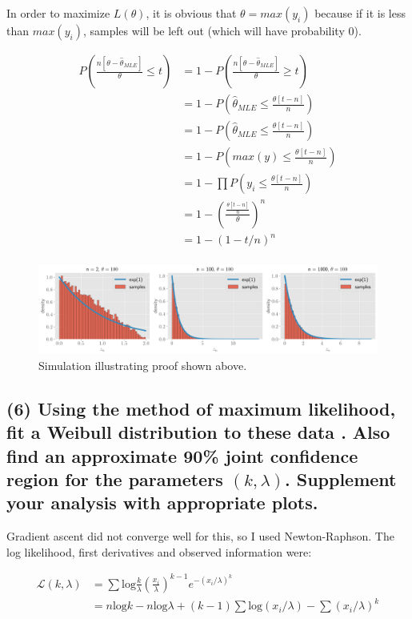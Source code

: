 \documentclass[11pt]{article}
\begin{document}
In order to maximize $L(\theta)$, it is obvious that $\theta = max(y_i)$ because if it is less than $ max(y_i)$, samples will be left out (which  will have probability 0).

\begin{align*}
    P\left(\frac{n[\theta-\hat{\theta}_{MLE}] }{\theta} \leq t\right) &= 1 -  P\left(\frac{n[\theta-\hat{\theta}_{MLE}] }{\theta}  \geq t\right)\\
    &= 1 -  P\left(\hat{\theta}_{MLE}  \leq \frac{\theta[t-n]}{n} \right)\\
     &= 1 -  P\left(\hat{\theta}_{MLE}  \leq \frac{\theta[t-n]}{n} \right)\\
      &= 1 -  P\left(max(y)  \leq \frac{\theta[t-n]}{n} \right)\\
       &= 1 -  \prod P\left(y_i  \leq \frac{\theta[t-n]}{n} \right)\\
        &= 1 -  \left( \frac{\frac{\theta[t-n]}{n}}{\theta} \right)^n\\
          &= 1 -  (1-t/n)^n\\
\end{align*}


\begin{figure}[!h]
    \centering
    \includegraphics[scale=.4]{homework_2/figures/uniform.png}
    \caption{Simulation illustrating proof shown above.}
    \label{fig:my_label}
\end{figure}

\subsection*{(6)  Using the method of maximum likelihood, fit a Weibull distribution to these data . Also find an approximate 90\% joint confidence region for the parameters $(k, \lambda)$. Supplement your analysis with appropriate plots.}

Gradient ascent did not converge well for this, so I used Newton-Raphson. The log likelihood, first derivatives and observed information were:

\begin{align*}
    \mathcal{L}(k, \lambda) &= \sum \text{log} \frac{k}{\lambda} \left(\frac{x_i}{\lambda}\right)^{k-1}e^{-(x_i/\lambda)^k}\\
    &=  n\text{log} k - n\text{log} \lambda + (k-1)\sum \text{log}(x_i/\lambda) -\sum(x_i/\lambda)^k
\end{align*}
\end{document}

